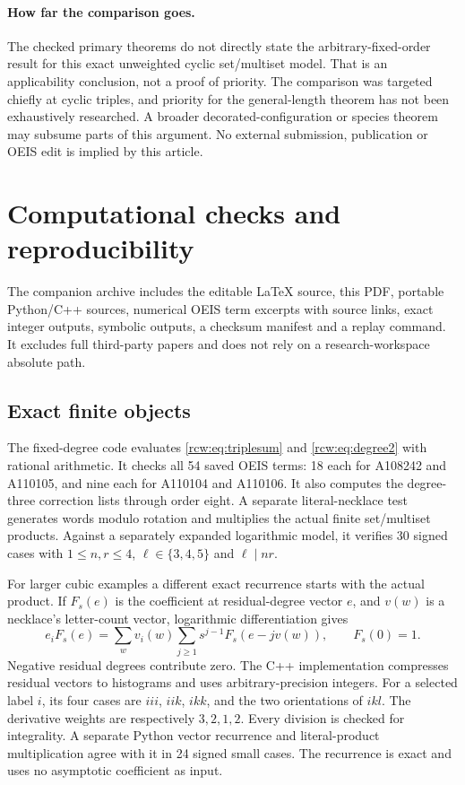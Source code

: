 \documentclass[11pt]{article}
\theoremstyle{definition}\newtheorem{definition}[theorem]{Definition}
\theoremstyle{remark}\newtheorem{remark}[theorem]{Remark}
\numberwithin{equation}{section}
\begin{document}
\paragraph{How far the comparison goes.}
The checked primary theorems do not directly state the arbitrary-fixed-order result for this exact unweighted cyclic set/multiset model. That is an applicability conclusion, not a proof of priority. The comparison was targeted chiefly at cyclic triples, and priority for the general-length theorem has not been exhaustively researched. A broader decorated-configuration or species theorem may subsume parts of this argument. No external submission, publication or OEIS edit is implied by this article.

\section{Computational checks and reproducibility}\label{rcw:sec:checks}
The companion archive includes the editable \LaTeX{} source, this PDF, portable Python/C++ sources, numerical OEIS term excerpts with source links, exact integer outputs, symbolic outputs, a checksum manifest and a replay command. It excludes full third-party papers and does not rely on a research-workspace absolute path.

\subsection{Exact finite objects}
The fixed-degree code evaluates \eqref{rcw:eq:triplesum} and \eqref{rcw:eq:degree2} with rational arithmetic. It checks all 54 saved OEIS terms: 18 each for A108242 and A110105, and nine each for A110104 and A110106. It also computes the degree-three correction lists through order eight. A separate literal-necklace test generates words modulo rotation and multiplies the actual finite set/multiset products. Against a separately expanded logarithmic model, it verifies 30 signed cases with $1\le n,r\le4$, $\ell\in\{3,4,5\}$ and $\ell\mid nr$.

For larger cubic examples a different exact recurrence starts with the actual product. If $F_s(e)$ is the coefficient at residual-degree vector $e$, and $v(w)$ is a necklace's letter-count vector, logarithmic differentiation gives
\begin{equation}\label{rcw:eq:exactrec}
 e_iF_s(e)=\sum_w v_i(w)\sum_{j\ge1}s^{j-1}F_s(e-jv(w)),
 \qquad F_s(0)=1.
\end{equation}
Negative residual degrees contribute zero. The C++ implementation compresses residual vectors to histograms and uses arbitrary-precision integers. For a selected label $i$, its four cases are $iii$, $iik$, $ikk$, and the two orientations of $ikl$. The derivative weights are respectively $3,2,1,2$. Every division is checked for integrality. A separate Python vector recurrence and literal-product multiplication agree with it in 24 signed small cases. The recurrence is exact and uses no asymptotic coefficient as input.
\end{document}
